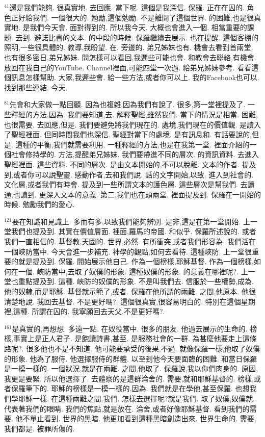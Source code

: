 \documentclass{book}
\begin{document}
$^{41}$還是我們能夠.
很真實地.
去回應.
當下呢.
這個是我深信.
保羅.
正在在囚的.
角色正好給我們.
一個很大的.
勉勵,這個勉勵.
不是離開了這個世界.
的困難,也是很真實地.
是我們今天會.
面對得到的.
所以我今天.
大概也會進入一個.
相當重要的課題.
去到.
避諾比書的文本.
的中段的時候.
保羅繼續去展示.
也在提醒.
這個客棚的照明,一些很具體的.
教導,我盼望.
在.
旁邊的.
弟兄姊妹也有.
機會去看到首兩堂.
也有很多密日,弟兄姊妹.
問怎樣可以看回,我遲些可能也會.
和教會去聯絡,有機會.
放回在我自己的YouTube.
Channel裡面,可能四堂一次過.
給弟兄姊妹參考.
看看這個訊息怎樣幫助.
大家,我遲些會.
給一些方法,或者你可以上.
我的Facebook也可以.
找到那些連結.
今天.

$^{81}$先會和大家做一點回顧.
因為也複雜,因為我們有說了.
很多,第一堂裡提及了.
一些釋經的方法,因為.
我們要知道,去.
解釋聖經,雖然我們.
當下的情況是相當.
困難,也很需要.
去回應,但是.
我們要避免將我們現在的.
處境,我們現在的價值觀.
是讀入了聖經裡面.
但同時間我們也深信.
聖經對當下的處境.
是有訊息和.
有話要說的,但是.
這種的平衡,我們就需要利用.
一種釋經的方法,也是在我第一堂.
裡面介紹的一個社會修持學的.
方法,提醒弟兄姊妹.
我們要帶進不同的層次.
的資訊資料.
去進入聖經裡面.
這些資料.
不同的層次.
是由文本開始的,不可以脫離.
文本的作者.
提及到,或者你可以說聖靈.
感動作者,去和我們說.
話的文字開始,以致.
進入到社會的.
文化層,或者我們有時會.
提及到一些所謂文本的護色層.
這些層次是幫我們.
去讀通,也讀到.
更深入文本的意義.
第二,我們也在頭兩堂.
裡面提及到.
保羅在一開始的時候.
勉勵我們的愛心.

$^{121}$要在知識和見識上.
多而有多,以致我們能夠辨別.
是非,這是在第一堂開始.
上一堂我們也提及到.
其實在價值層面.
裡面,羅馬的帝國.
和似乎.
保羅所述說的.
或者我們一直相信的.
基督教,天國的.
世界,必然.
有所衝突,或者我們形容為.
我們活在一個峽防當中.
今天會進一步補充.
神學的觀點,如何去看待.
這種峽防.
上一堂很重要的就是提及到.
保羅.
開始展示他自己.
作為一個榜樣,耶穌基督.
作為一個榜樣,如何在一個.
峽防當中,去取了奴僕的形象.
這種奴僕的形象.
的意義在哪裡呢?.
上一堂也重點提及到.
這種.
峽防的奴僕的形象.
不是叫我們去.
信服於一些權勢,成為.
他的奴隸,而是耶穌.
基督就示範了,或者.
保羅在他所謂的兩難.
之間,他原本.
他很清楚地說.
我回去基督.
不是更好嗎?.
這個很真實,很容易明白的.
特別在這個星期裡,這種.
所謂在囚的.
我寧願回去天父,不是更好嗎?.

$^{161}$是真實的,再想想.
多遠一點.
在奴役當中.
很多的朋友.
他過去展示的生命的.
榜樣,事實上是正人君子.
是飽讀詩書,甚至.
是服務社會的一群.
為甚麼他要走上這條路呢?.
很多他也不是不知道.
他可能要承受的後果,不過.
就像保羅一樣,他取了奴僕的形象.
他為了服侍.
他選擇服侍的群體.
以至到他今天要面臨的困難.
和當日保羅是一模一樣的.
一個狀況,就是在兩難.
之間,他取了.
保羅說,我以你們肉身的.
原因,我更是要緊.
所以他選擇了.
去體察的是這群淪舍的.
需要,就和耶穌基督的.
榜樣,或者保羅筆下的.
耶穌的榜樣是一模一樣的,因為.
我們就是在學他,甚至保羅.
也想我們學耶穌一樣.
在這種兩難之間,我們.
怎樣去選擇呢?就是我們.
取了奴僕,奴僕就.
代表著我們的眼睛.
我們的焦點,就是放在.
淪舍,或者好像耶穌基督.
看到我們的需要.
他不單止看到.
世界的黑暗.
他更加看到這種黑暗創造出來.
世界生命的.
需要,我們都是.
被罪所傷的.
\end{document}
